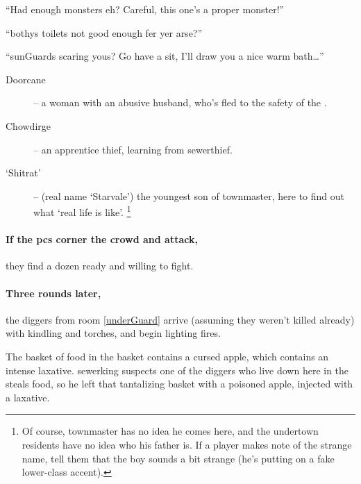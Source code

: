 \begin{speechtext}

  ``Had enough monsters eh?
  Careful, this one's a proper monster!''

  ``\Glspl{bothy} toilets not good enough fer yer arse?''

  ``\Glspl{sunGuard} scaring yous?
  Go have a sit, I'll draw you a nice warm bath\ldots''

\end{speechtext}

\begin{description}
  \item[Doorcane] -- a woman with an abusive husband, who's fled to the safety of the .
  \item[Chowdirge] -- an apprentice thief, learning from \gls{sewerthief}.
  \item[`Shitrat'] -- (real name `Starvale') the youngest son of \gls{townmaster}, here to find out what `real life is like'.%
  \footnote{Of course, \gls{townmaster} has no idea he comes here, and the undertown residents have no idea who his father is.  If a player makes note of the strange name, tell them that the boy sounds a bit strange (he's putting on a fake lower-class accent).}
\end{description}

\paragraph{If the \glspl{pc} corner the crowd and attack,}
they find a dozen ready and willing to fight.

\sewerking



\paragraph{Three rounds later,}
the \glspl{digger} from room \ref{underGuard} arrive (assuming they weren't killed already) with kindling and torches, and begin lighting fires.


\begin{exampletext}
  The basket of food in the basket contains a cursed apple, which contains an intense laxative.
  \Gls{sewerking} suspects one of the \glspl{digger} who live down here in the  steals food, so he left that tantalizing basket with a poisoned apple, injected with a laxative.
\end{exampletext}

